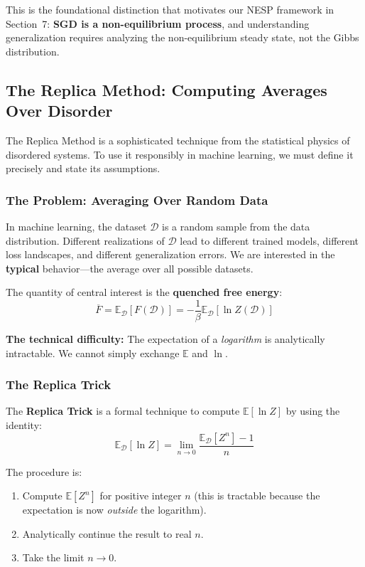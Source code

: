\documentclass[
  journal=largetwo,
  simfonts=false,
  year=2025,
  volume=37,
]{cup-journal}
\begin{document}
This is the foundational distinction that motivates our NESP framework in Section~7: \textbf{SGD is a non-equilibrium process}, and understanding generalization requires analyzing the non-equilibrium steady state, not the Gibbs distribution.

\subsection{The Replica Method: Computing Averages Over Disorder}

The Replica Method is a sophisticated technique from the statistical physics of disordered systems. To use it responsibly in machine learning, we must define it precisely and state its assumptions.

\subsubsection{The Problem: Averaging Over Random Data}

In machine learning, the dataset $\mathcal{D}$ is a random sample from the data distribution. Different realizations of $\mathcal{D}$ lead to different trained models, different loss landscapes, and different generalization errors. We are interested in the \textbf{typical} behavior---the average over all possible datasets.

The quantity of central interest is the \textbf{quenched free energy}:
\begin{equation}
    \overline{F} = \mathbb{E}_{\mathcal{D}} \left[ F(\mathcal{D}) \right] = -\frac{1}{\beta} \mathbb{E}_{\mathcal{D}} \left[ \ln Z(\mathcal{D}) \right]
\end{equation}

\textbf{The technical difficulty:} The expectation of a \textit{logarithm} is analytically intractable. We cannot simply exchange $\mathbb{E}$ and $\ln$.

\subsubsection{The Replica Trick}

\begin{definition}\label{def:replica_trick}
The \textbf{Replica Trick} is a formal technique to compute $\mathbb{E}[\ln Z]$ by using the identity:
\begin{equation}\label{eq:replica_identity}
    \boxed{\mathbb{E}_{\mathcal{D}}[\ln Z] = \lim_{n \to 0} \frac{\mathbb{E}_{\mathcal{D}}[Z^n] - 1}{n}}
\end{equation}

The procedure is:
\begin{enumerate}
    \item Compute $\mathbb{E}[Z^n]$ for positive integer $n$ (this is tractable because the expectation is now \textit{outside} the logarithm).
    \item Analytically continue the result to real $n$.
    \item Take the limit $n \to 0$.
\end{enumerate}
\end{definition}
\end{document}
